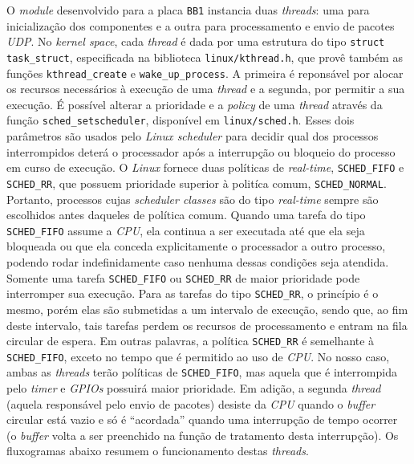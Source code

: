 O \textit{module} desenvolvido para a placa \texttt{BB1} instancia duas
\textit{threads}: uma para inicialização dos componentes e a outra para
processamento e envio de pacotes \textit{UDP}. No \textit{kernel space}, cada
\textit{thread} é dada por uma estrutura do tipo \texttt{struct
task\_struct}, especificada na biblioteca \texttt{linux/kthread.h}, que provê
também as funções \texttt{kthread\_create} e \texttt{wake\_up\_process}. A
primeira é reponsável por alocar os recursos necessários à execução de uma
\textit{thread} e a segunda, por permitir a sua execução. É possível alterar a
prioridade e a \textit{policy} de uma \textit{thread} através da função
\texttt{sched\_setscheduler}, disponível em \texttt{linux/sched.h}. Esses dois
parâmetros são usados pelo \textit{Linux scheduler} para decidir qual
dos processos interrompidos deterá o processador após a interrupção ou
bloqueio do processo em curso de execução. O \textit{Linux} fornece duas
políticas de \textit{real-time}, \texttt{SCHED\_FIFO} e
\texttt{SCHED\_RR}, que possuem prioridade superior à politíca comum,
\texttt{SCHED\_NORMAL}. Portanto, processos cujas \textit{scheduler classes} são
do tipo \textit{real-time} sempre são escolhidos antes daqueles de política
comum. Quando uma tarefa do tipo \texttt{SCHED\_FIFO} assume a \textit{CPU}, ela
continua a ser executada até que ela seja bloqueada ou que ela conceda
explicitamente o processador a outro processo, podendo rodar
indefinidamente caso nenhuma dessas condições seja atendida. Somente uma tarefa
\texttt{SCHED\_FIFO} ou \texttt{SCHED\_RR} de maior prioridade pode interromper
sua execução. Para as tarefas do tipo \texttt{SCHED\_RR}, o princípio é o mesmo,
porém elas são submetidas a um intervalo de execução, sendo que, ao fim deste
intervalo, tais tarefas perdem os recursos de processamento e entram na fila
circular de espera. Em outras palavras, a política \texttt{SCHED\_RR} é
semelhante à \texttt{SCHED\_FIFO}, exceto no tempo que é
permitido ao uso de \textit{CPU}. No nosso caso, ambas as \textit{threads} terão
políticas de \texttt{SCHED\_FIFO}, mas aquela que é interrompida pelo
\textit{timer} e \textit{GPIOs} possuirá maior prioridade. Em adição, a segunda
\textit{thread} (aquela responsável pelo envio de pacotes) desiste da
\textit{CPU} quando o \textit{buffer} circular está vazio e só é ``acordada''
quando uma interrupção de tempo ocorrer (o \textit{buffer} volta a ser
preenchido na função de tratamento desta interrupção). Os fluxogramas abaixo
resumem o funcionamento destas \textit{threads}.

\FloatBarrier
			    
